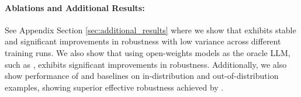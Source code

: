 \vspace{-0.1in}
\paragraph{Ablations and Additional Results:} See Appendix Section \ref{sec:additional_results} where we show that \carma{} exhibits stable and significant improvements in robustness with low variance across different training runs. We also show that using open-weights models as the oracle LLM, such as , \carma{} exhibits significant improvements in robustness. Additionally, we also show performance of \carma{} and baselines on in-distribution and out-of-distribution examples, showing superior effective robustness achieved by \carma{}.